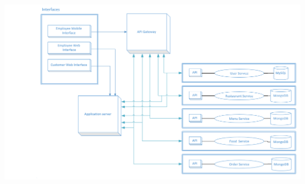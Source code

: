 \documentclass[12pt]{article}
\newenvironment{Figure}
	{\par\medskip\noindent\minipage{\linewidth}}
	{\endminipage\par\medskip}
\begin{document}
\begin{Figure}
\includegraphics[width=\linewidth]{illustrations/Finalapp2.png}
\label{fig:applicationdiagram}
\end{Figure}
\end{document}
